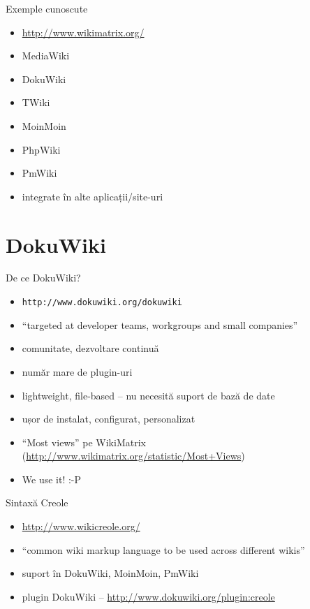 \documentclass{beamer}
\begin{document}
\begin{frame}{Exemple cunoscute}
  \begin{itemize}
    \item \url{http://www.wikimatrix.org/}
    \item MediaWiki
    \item DokuWiki
    \item TWiki
    \item MoinMoin
    \item PhpWiki
    \item PmWiki
    \item integrate în alte aplicații/site-uri
  \end{itemize}
\end{frame}

\section{DokuWiki}

\frame{\tableofcontents[currentsection]}

\begin{frame}{De ce DokuWiki?}
  \begin{itemize}
    \pause \item \texttt{http://www.dokuwiki.org/dokuwiki}
    \pause \item ``targeted at developer teams, workgroups and small companies''
    \pause \item comunitate, dezvoltare continuă
    \pause \item număr mare de plugin-uri
    \pause \item lightweight, file-based -- nu necesită suport de bază de date
    \pause \item ușor de instalat, configurat, personalizat
    \pause \item ``Most views'' pe WikiMatrix
(\url{http://www.wikimatrix.org/statistic/Most+Views})
    \pause \item We use it! :-P
  \end{itemize}
\end{frame}

\begin{frame}{Sintaxă Creole}
  \begin{itemize}
    \item \url{http://www.wikicreole.org/}
    \item ``common wiki markup language to be used across different wikis''
    \item suport în DokuWiki, MoinMoin, PmWiki
    \item plugin DokuWiki -- \url{http://www.dokuwiki.org/plugin:creole}
  \end{itemize}
\end{frame}
\end{document}
